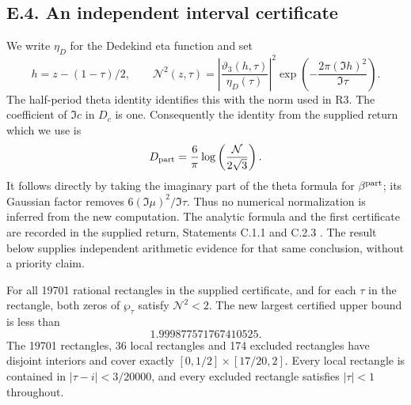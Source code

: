 \subsection{E.4. An independent interval certificate}
\label{sec:e4}

We write $\eta_D$ for the Dedekind eta function and set
\[
 h=z-(1-\tau)/2,\qquad
 \mathcal N^2(z,\tau)=
 \left|\frac{\vartheta_3(h,\tau)}{\eta_D(\tau)}\right|^2
 \exp\left(-\frac{2\pi(\Im h)^2}{\Im\tau}\right).
\]
The half-period theta identity identifies this with the norm used in
R3. The coefficient of $\Im c$ in $D_c$ is one. Consequently the
identity from the supplied return which we use is
\[
 D_{\rm part}=\frac6\pi
 \log\left(\frac{\mathcal N}{2\sqrt3}\right).
\]
It follows directly by taking the imaginary part of the theta formula
for $\beta^{\rm part}$; its Gaussian factor removes
$6(\Im\mu)^2/\Im\tau$. Thus no numerical normalization is inferred
from the new computation. The analytic formula and the first
certificate are recorded in the supplied return, Statements C.1.1
and C.2.3 \citep{family2026}. The result below supplies independent
arithmetic evidence for that same conclusion, without a priority claim.

\begin{theorem}
For all 19701 rational rectangles in the supplied certificate, and for
each $\tau$ in the rectangle, both zeros of $\wp_\tau$ satisfy
$\mathcal N^2<2$. The new largest certified upper bound is less than
\[
 1.999877571767410525.
\]
The 19701 rectangles, 36 local rectangles and 174 excluded rectangles
have disjoint interiors and cover exactly
$[0,1/2]\times[17/20,2]$. Every local rectangle is contained in
$|\tau-i|<3/20000$, and every excluded rectangle satisfies
$|\tau|<1$ throughout.
\end{theorem}

